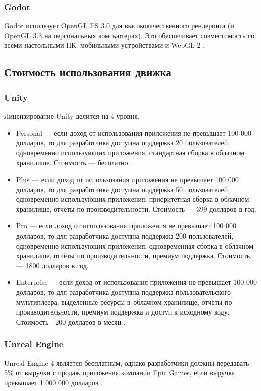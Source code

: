 \subsubsection{Godot}
Godot использует OpenGL ES 3.0 для высококачественного рендеринга (и OpenGL 3.3 на персональных компьютерах). Это обеспечивает совместимость со всеми настольными ПК, мобильными устройствами и WebGL 2 \cite{godot}.

\subsection{Стоимость использования движка}
\subsubsection{Unity}
Лицензирование Unity делится на 4 уровня.
\begin{itemize}
\item Personal --- если доход от использования приложения не превышает 100 000 долларов, то для разработчика доступна поддержка 20 пользователей, одновременно использующих приложения, стандартная сборка в облачном хранилище. Стоимость --- бесплатно.
\item Plus --- если доход от использования приложения не превышает 100 000 долларов, то для разработчика доступна поддержка 50 пользователей, одновременно использующих приложения, приоритетная сборка в облачном хранилище, отчёты по производительности. Стоимость --- 399 долларов в год.
\item Pro --- если доход от использования приложения не превышает 100 000 долларов, то для разработчика доступна поддержка 200 пользователей, одновременно использующих приложения, одновременная сборка в облачном хранилище, отчёты по производительности, премиум поддержка. Стоимость --- 1800 долларов в год.
\item Enterprise --- если доход от использования приложения не превышает 100 000 долларов, то для разработчика доступна поддержка пользовательского мультиплеера, выделенные ресурсы в облачном хранилище, отчёты по производительности, премиум поддержка и доступ к исходному коду. Стоимость - 200 долларов в месяц \cite{unity}.
\end{itemize}
\subsubsection{Unreal Engine}
Unreal Engine 4 является бесплатным, однако разработчики должны передавать 5\% от выручки с продаж приложения компании Epic Games, если выручка превышает 1 000 000 долларов \cite{unreal}. 
